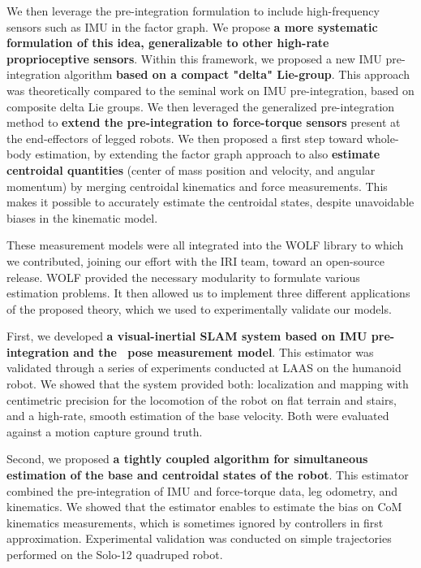 We then leverage the pre-integration formulation to include high-frequency sensors such as IMU in the factor graph. We propose 
\textbf{a more systematic formulation of this idea, generalizable to other high-rate proprioceptive sensors}. Within this framework, we proposed a new 
IMU pre-integration algorithm \textbf{based on a compact "delta" Lie-group}.
This approach was theoretically compared to the seminal work on IMU pre-integration, based on composite delta Lie groups. 
We then leveraged the generalized pre-integration method to \textbf{extend the pre-integration to force-torque sensors} present at the end-effectors of
legged robots. 
%
We then proposed a first step toward whole-body estimation, by extending the factor graph approach to also \textbf{estimate centroidal quantities}
(center of mass position and velocity, and angular momentum) by merging centroidal kinematics and force measurements. This makes it possible 
to accurately estimate the centroidal states, despite unavoidable biases in the kinematic model. 


These measurement models were all integrated into the WOLF library \cite{sola2021wolf} to which we contributed, joining our effort with the IRI team, 
toward an open-source release. WOLF provided the necessary modularity to formulate various estimation
problems. It then allowed us to implement three different applications of the proposed theory, which we used to experimentally validate our models.

\bigskip

First, we developed \textbf{a visual-inertial SLAM system based on IMU pre-integration and the \apriltag\ pose measurement model}. This estimator was validated through
a series of experiments conducted at LAAS on the  humanoid robot. We showed that the system provided both: localization and mapping with centimetric precision
for the locomotion of the robot on flat terrain and stairs, and a high-rate, smooth estimation of the base velocity. Both were evaluated against a motion capture 
ground truth. 

Second, we proposed \textbf{a tightly coupled algorithm for simultaneous estimation of the base and centroidal states of the robot}. This estimator combined the pre-integration 
of IMU and force-torque data, leg odometry, and kinematics. We showed that the estimator enables to estimate the bias on CoM kinematics measurements, which is sometimes ignored
by controllers in first approximation. Experimental validation was conducted on simple trajectories performed on the Solo-12 quadruped robot. 

